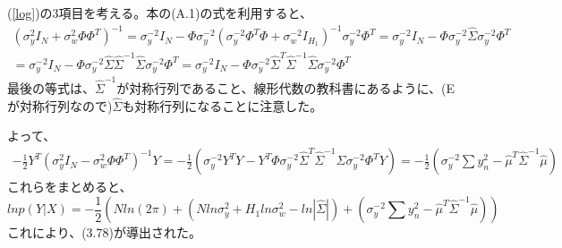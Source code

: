 \documentclass{jsarticle}
\begin{document}
(\ref{log})の3項目を考える。本の(A.1)の式を利用すると、
\begin{equation}
\begin{split}
(\sigma_y^2 I_N + \sigma_w^2 \Phi \Phi^T)^{-1} = \sigma_y^{-2} I_N -  \Phi \sigma_y^{-2} (\sigma_y^{-2} \Phi^T \Phi + \sigma_w^{-2} I_{H_1})^{-1} \sigma_y^{-2} \Phi^T
=\sigma_y^{-2} I_N -  \Phi \sigma_y^{-2} \hat{\Sigma} \sigma_y^{-2} \Phi^T\\
=\sigma_y^{-2} I_N -  \Phi \sigma_y^{-2} \hat{\Sigma} \hat{\Sigma}^{-1} \hat{\Sigma} \sigma_y^{-2} \Phi^T
=\sigma_y^{-2} I_N -  \Phi \sigma_y^{-2} \hat{\Sigma}^T \hat{\Sigma}^{-1} \hat{\Sigma} \sigma_y^{-2} \Phi^T
\end{split}
\end{equation}
最後の等式は、$\hat{\Sigma}^{-1}$が対称行列であること、線形代数の教科書にあるように、(Eが対称行列なので)$\hat{\Sigma}$も対称行列になることに注意した。

よって、
\begin{equation}
\begin{split}
-\frac{1}{2}Y^T(\sigma_y^2 I_N - \sigma_w^2 \Phi \Phi^T)^{-1}Y = -\frac{1}{2}(\sigma_y^{-2} Y^T Y -  Y^T\Phi \sigma_y^{-2} \hat{\Sigma}^T \hat{\Sigma}^{-1} \hat{\Sigma} \sigma_y^{-2} \Phi^T Y) 
= -\frac{1}{2}(\sigma_y^{-2} \sum y_n^2 -  \hat{\mu}^T \hat{\Sigma}^{-1} \hat{\mu})
\end{split}
\end{equation}
これらをまとめると、
\begin{equation}
ln p(Y|X) = -\frac{1}{2}(Nln(2\pi) + (N ln \sigma_y^2 + H_1 ln \sigma_w^2 - ln|{\hat{\Sigma}}|) + (\sigma_y^{-2} \sum y_n^2 - \hat{\mu}^T \hat{\Sigma}^{-1} \hat{\mu}))
\end{equation}
これにより、(3.78)が導出された。
\end{document}
